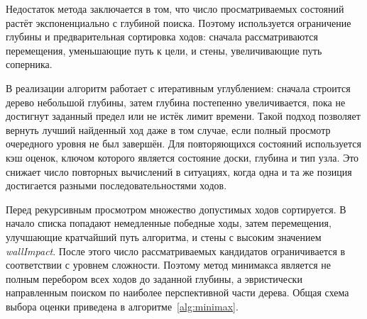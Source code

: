 \documentclass{csmathnotes}
\begin{document}
Недостаток метода заключается в том, что число просматриваемых состояний растёт экспоненциально с глубиной поиска. Поэтому используется ограничение глубины и предварительная сортировка ходов: сначала рассматриваются перемещения, уменьшающие путь к цели, и стены, увеличивающие путь соперника.

В реализации алгоритм работает с итеративным углублением: сначала строится дерево небольшой глубины, затем глубина постепенно увеличивается, пока не достигнут заданный предел или не истёк лимит времени. Такой подход позволяет вернуть лучший найденный ход даже в том случае, если полный просмотр очередного уровня не был завершён. Для повторяющихся состояний используется кэш оценок, ключом которого является состояние доски, глубина и тип узла. Это снижает число повторных вычислений в ситуациях, когда одна и та же позиция достигается разными последовательностями ходов.

Перед рекурсивным просмотром множество допустимых ходов сортируется. В начало списка попадают немедленные победные ходы, затем перемещения, улучшающие кратчайший путь алгоритма, и стены с высоким значением \textit{wallImpact}. После этого число рассматриваемых кандидатов ограничивается в соответствии с уровнем сложности. Поэтому метод минимакса является не полным перебором всех ходов до заданной глубины, а эвристически направленным поиском по наиболее перспективной части дерева. Общая схема выбора оценки приведена в алгоритме~\ref{alg:minimax}.

\begin{algorithm}[!t]
\caption{Метод минимакса с итеративным углублением}\label{alg:minimax}
\end{algorithm}
\end{document}
